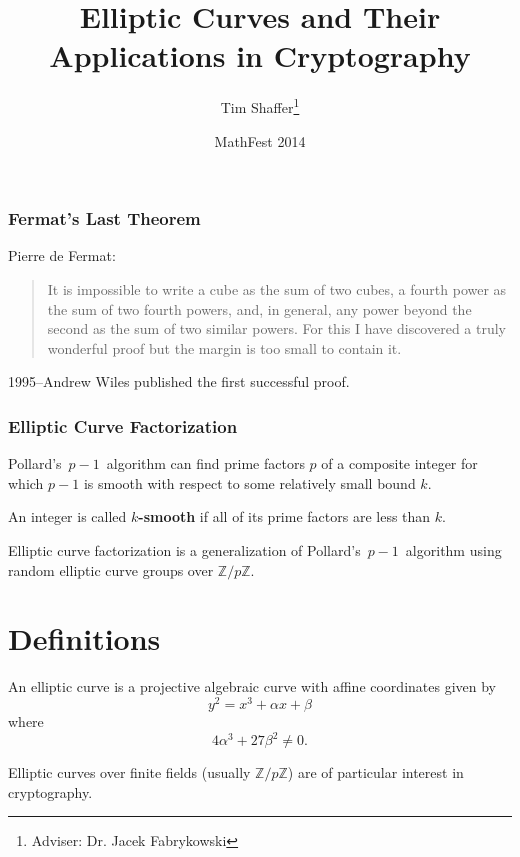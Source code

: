 \documentclass{beamer}
\title[Elliptic Curve Cryptography]{Elliptic Curves and
    Their Applications in Cryptography}
\author{Tim Shaffer\thanks{Adviser: Dr. Jacek Fabrykowski}}
\institute[YSU]{Youngstown State University}
\date{MathFest 2014}
\newcommand{\zmod}[1]{\ensuremath{\mathbb{Z}/#1\mathbb{Z}}}
\begin{document}
    \frenchspacing
    \frame{\maketitle}

    \begin{frame}
        \frametitle{Fermat's Last Theorem}
        Pierre de Fermat: %
        \begin{quote}
            It is impossible to write a cube as the sum of two cubes, a fourth
            power as the sum of two fourth powers, and, in general, any power
            beyond the second as the sum of two similar powers. For this I
            have discovered a truly wonderful proof but the margin is too
            small to contain it.
        \end{quote}
        \vfill
        1995--Andrew Wiles published the first successful proof.
    \end{frame}

    \begin{frame}
        \frametitle{Elliptic Curve Factorization}
        Pollard's~\(p - 1\)~algorithm can find prime factors \(p\) of a
        composite integer for which \(p - 1\) is smooth with respect to some
        relatively small bound \(k\).
        \vfill
        \begin{definition}
            An integer is called \textbf{\(k\)-smooth} if all of its prime
            factors are less than \(k\).
        \end{definition}
        \vfill
        Elliptic curve factorization is a generalization of
        Pollard's~\(p - 1\)~algorithm using random elliptic curve groups
        over \zmod{p}.
    \end{frame}

    \section{Definitions}
    \begin{frame}
        \begin{definition}
            An elliptic curve is a projective algebraic curve with
            affine coordinates given by \[y^2 = x^3 + \alpha x + \beta\]
            where \[4\alpha^3 + 27\beta^2 \neq 0.\]
        \end{definition}
        \vfill
        Elliptic curves over finite fields (usually \zmod{p}) are of
        particular interest in cryptography.
    \end{frame}
\end{document}
